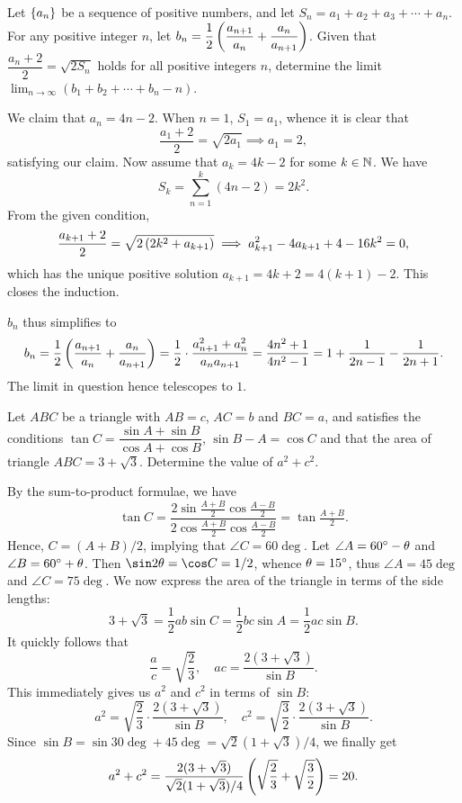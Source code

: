\begin{question}[1]\label{A::2023-O-1-18}
    Let $\left\lbrace a_n \right\rbrace$ be a sequence of positive numbers, and let $S_n = a_1 + a_2 + a_3 + \cdots + a_n$. For any positive integer $n$, let $b_n = \dfrac12 \left( \dfrac{a_{n+1}}{a_n} + \dfrac{a_n}{a_{n+1}} \right)$. Given that $\dfrac{a_n + 2}{2} = \sqrt{2S_n}$ holds for all positive integers $n$, determine the limit $\lim_{n \to \infty} (b_1 + b_2 + \cdots + b_n - n)$.
\end{question}
\begin{solution*}
    We claim that $a_n = 4n - 2$. When $n = 1$, $S_1 = a_1$, whence it is clear that \[\frac{a_1 + 2}{2} = \sqrt{2a_1} \implies a_1 = 2,\] satisfying our claim. Now assume that $a_k = 4k - 2$ for some $k \in \mathbb{N}$. We have \[S_k = \sum_{n = 1}^k (4n - 2) = 2k^2.\] From the given condition, \[\frac{a_{k+1} + 2}{2} = \sqrt{2 \left( 2k^2 + a_{k+1} \right)} \implies a^2_{k+1} - 4a_{k+1} + 4 - 16k^2 = 0,\] which has the unique positive solution $a_{k+1} = 4k + 2 = 4(k+1) - 2$. This closes the induction.

    $b_n$ thus simplifies to \[b_n = \frac12 \left( \dfrac{a_{n+1}}{a_n} + \dfrac{a_n}{a_{n+1}} \right) = \frac12 \cdot \frac{a^2_{n+1} + a^2_n}{a_n a_{n+1}} = \frac{4n^2 + 1}{4n^2 - 1} = 1 + \frac1{2n-1} - \frac{1}{2n+1}.\] The limit in question hence telescopes to $1$.
\end{solution*}
    
\begin{question}[20]\label{A::2023-O-1-19}
    Let $ABC$ be a triangle with $AB = c$, $AC = b$ and $BC = a$, and satisfies the conditions $\tan C = \dfrac{\sin A + \sin B}{\cos A + \cos B}$, $\sin{B - A} = \cos C$ and that the area of triangle $ABC = 3 + \sqrt{3}$. Determine the value of $a^2 + c^2$.
\end{question}
\begin{solution*}
    By the sum-to-product formulae, we have \[\tan C = \frac{2\sin{\frac{A+B}{2}} \cos{\frac{A-B}{2}}}{2\cos{\frac{A+B}{2}} \cos{\frac{A-B}{2}}} = \tan{\tfrac{A+B}{2}}.\] Hence, $C = (A+B)/2$, implying that $\angle C = 60\deg$. Let $\angle A = 60^{\circ} - \theta$ and $\angle B = 60^{\circ} + \theta$. Then $\sin 2\t = \cos C = 1/2$, whence $\theta = 15^{\circ}$, thus $\angle A = 45\deg$ and $\angle C = 75\deg$. We now express the area of the triangle in terms of the side lengths: \[3 + \sqrt{3} = \frac12 ab \sin C = \frac12 bc \sin A = \frac12 ac \sin B.\] It quickly follows that \[\frac{a}{c} = \sqrt{\frac23}, \quad ac = \frac{2(3 + \sqrt3)}{\sin B}.\] This immediately gives us $a^2$ and $c^2$ in terms of $\sin B$: \[a^2 = \sqrt{\frac23} \cdot \frac{2(3 + \sqrt3)}{\sin B}, \quad c^2 = \sqrt{\frac32} \cdot \frac{2(3 + \sqrt3)}{\sin B}.\] Since $\sin B = \sin{30\deg + 45\deg} = \sqrt{2}(1 + \sqrt3)/4$, we finally get \[a^2 + c^2 = \frac{2(3 + \sqrt3)}{\sqrt{2}(1 + \sqrt3)/4} \left( \sqrt{\frac23} + \sqrt{\frac32} \right) = 20.\]
\end{solution*}
    
